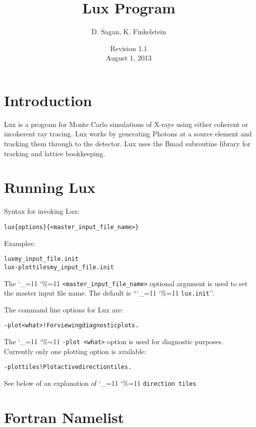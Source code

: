 \documentclass[11pt]{article}
\title{Lux Program}
\author{D. Sagan, K. Finkelstein}
\date{Revision 1.1 \\ August 1, 2013}
\newcommand{\lux}{Lux\xspace}
\newcommand\ttcmd{\begingroup\catcode`\_=11 \catcode`\%=11 \dottcmd}
\newcommand\dottcmd[1]{\texttt{#1}\endgroup}
\newcommand{\vn}{\ttcmd}
\newenvironment{example}
  {\vspace{\ExBeg} \begin{alltt}}
  {\end{alltt} \vspace{\ExEnd}}
\newlength{\ExBeg}
\newlength{\ExEnd}
\begin{document}
\maketitle

\tableofcontents

\section{Introduction} 
\label{s:intro}

\lux is a program for Monte Carlo simulations of X-rays using either
coherent or incoherent ray tracing. \lux works by generating
Photons at a source element and tracking them through to the
detector. \lux uses the Bmad subroutine library\cite{b:bmad} for
tracking and lattice bookkeeping.

\section{Running \lux} 
\label{s:run}

Syntax for invoking \lux:
\begin{example}
  lux \{options\} \{<master_input_file_name>\}
\end{example}
Examples:
\begin{example}
  lux my_input_file.init
  lux -plot tiles  my_input_file.init
\end{example}

The \vn{<master_input_file_name>} optional argument is used to set the
master input file name. The default is ``\vn{lux.init}''. 

The command line options for \lux are:
\begin{example}
  -plot <what>  ! For viewing diagnostic plots.
\end{example}

The \vn{-plot <what>} option is used for diagnostic purposes. 
Currently only one plotting option is available:
\begin{example}
  -plot tiles   ! Plot active direction tiles.
\end{example}
See below of an explanation of \vn{direction tiles}

\section{Fortran Namelist}
\label{s:namelist}
\end{document}

